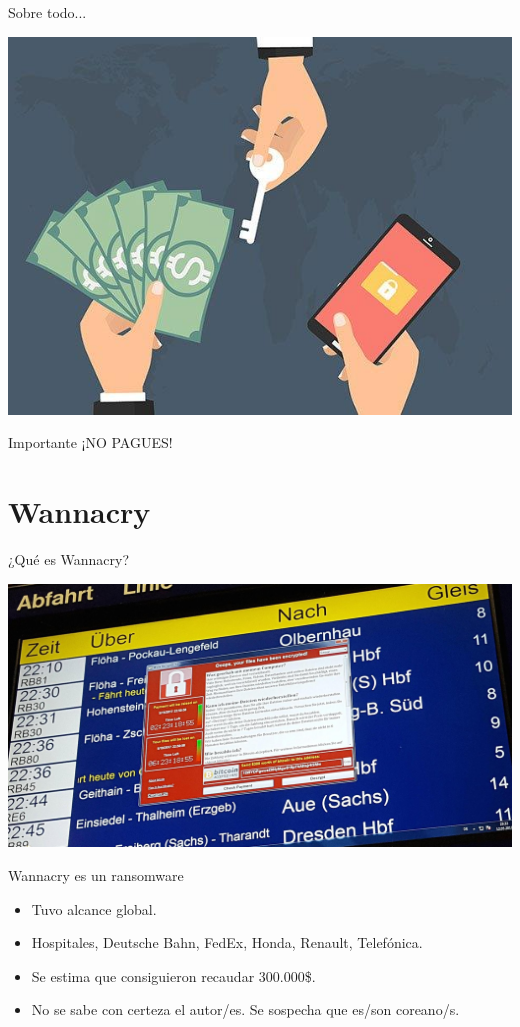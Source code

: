 \documentclass[10pt]{beamer}
\begin{document}
\begin{frame}[fragile]{Sobre todo...}
	\begin{center}
		\includegraphics[scale=0.5]{./Imagenes/ransomware9.jpg}
	\end{center}
	\pause
	\begin{alertblock}{Importante}
		¡NO PAGUES!
	\end{alertblock}
\end{frame}

\section{Wannacry}

\begin{frame}[fragile]{¿Qué es Wannacry?}
	\begin{center}
		\includegraphics[scale=0.12]{./Imagenes/ransomware10.jpg}
	\end{center}
	\pause
	\begin{block}{Wannacry es un ransomware}
		\pause
		\begin{itemize}
			\item Tuvo alcance global.
			\pause
			\item Hospitales, Deutsche Bahn, FedEx, Honda, Renault, Telefónica.
			\pause
			\item Se estima que consiguieron recaudar 300.000\$.
			\pause
			\item No se sabe con certeza el autor/es. Se sospecha que es/son coreano/s.
		\end{itemize}
	\end{block}
\end{frame}
\end{document}
